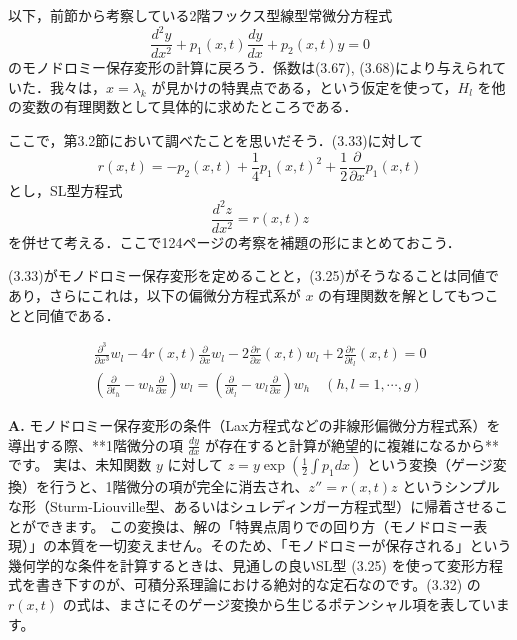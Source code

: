 \begin{story}

以下，前節から考察している2階フックス型線型常微分方程式
\begin{equation}
    \frac{d^2 y}{dx^2} + p_1(x,t) \frac{dy}{dx} + p_2(x,t)y = 0 \label{eq:3.33}
\end{equation}
のモノドロミー保存変形の計算に戻ろう．係数は(3.67), (3.68)により与えられていた．我々は，$x=\lambda_k$ が見かけの特異点である，という仮定を使って，$H_l$ を他の変数の有理関数として具体的に求めたところである．

ここで，第3.2節において調べたことを思いだそう．(3.33)に対して
\begin{equation}
    r(x,t) = -p_2(x,t) + \frac{1}{4}p_1(x,t)^2 + \frac{1}{2}\frac{\partial}{\partial x}p_1(x,t) \label{eq:3.32}
\end{equation}
とし，SL型方程式
\begin{equation}
    \frac{d^2 z}{dx^2} = r(x,t)z \label{eq:3.25}
\end{equation}
を併せて考える．ここで124ページの考察を補題の形にまとめておこう．

\begin{lemma}[3.5]
(3.33)がモノドロミー保存変形を定めることと，(3.25)がそうなることは同値であり，さらにこれは，以下の偏微分方程式系が $x$ の有理関数を解としてもつことと同値である．

\begin{align}
    \frac{\partial^3}{\partial x^3}w_l - 4r(x,t)\frac{\partial}{\partial x}w_l - 2\frac{\partial r}{\partial x}(x,t)w_l + 2\frac{\partial r}{\partial t_l}(x,t) = 0 \label{eq:3.82} \\
    \left( \frac{\partial}{\partial t_h} - w_h \frac{\partial}{\partial x} \right) w_l = \left( \frac{\partial}{\partial t_l} - w_l \frac{\partial}{\partial x} \right) w_h \quad (h,l = 1,\cdots,g) \label{eq:3.83}
\end{align}

\end{lemma}
\end{story}

\begin{Q}
\textbf{A.} モノドロミー保存変形の条件（Lax方程式などの非線形偏微分方程式系）を導出する際、**1階微分の項 $\frac{dy}{dx}$ が存在すると計算が絶望的に複雑になるから**です。
実は、未知関数 $y$ に対して $z = y \exp(\frac{1}{2}\int p_1 dx)$ という変換（ゲージ変換）を行うと、1階微分の項が完全に消去され、$z'' = r(x,t)z$ というシンプルな形（Sturm-Liouville型、あるいはシュレディンガー方程式型）に帰着させることができます。
この変換は、解の「特異点周りでの回り方（モノドロミー表現）」の本質を一切変えません。そのため、「モノドロミーが保存される」という幾何学的な条件を計算するときは、見通しの良いSL型 (3.25) を使って変形方程式を書き下すのが、可積分系理論における絶対的な定石なのです。(3.32) の $r(x,t)$ の式は、まさにそのゲージ変換から生じるポテンシャル項を表しています。
\end{Q}

